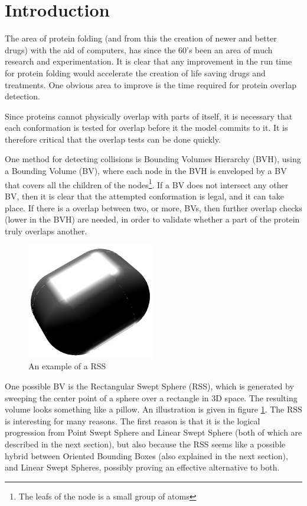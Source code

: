 
\section{Introduction}
\label{introduction}

The area of protein folding (and from this the creation of newer and better drugs) with the aid of computers, has since the 60's been an area of much research and experimentation. It is clear that any improvement in the run time for protein folding would accelerate the creation of life saving drugs and treatments. One obvious area to improve is the time required for protein overlap detection.

Since proteins cannot physically overlap with parts of itself, it is necessary that each conformation is tested for overlap before it the model commits to it. It is therefore critical that the overlap tests can be done quickly.

One method for detecting collisions is Bounding Volumes Hierarchy (BVH), using a Bounding Volume (BV), where each node in the BVH is enveloped by a BV that covers all the children of the nodes\footnote{The leafs of the node is a small group of atoms}. If a BV does not intersect any other BV, then it is clear that the attempted conformation is legal, and it can take place. If there is a overlap between two, or more, BVs, then further overlap checks (lower in the BVH) are needed, in order to validate whether a part of the protein truly overlaps another.

\begin{figure}
\centering
\includegraphics[width=0.5\textwidth]{figures/rss}
\caption{\label{rss-example-figure}An example of a RSS}
\end{figure}

One possible BV is the Rectangular Swept Sphere (RSS), which is generated by sweeping the center point of a sphere over a rectangle in 3D space. The resulting volume looks something like a pillow. An illustration is given in figure \ref{rss-example-figure}. The RSS is interesting for many reasons. The first reason is that it is the logical progression from Point Swept Sphere and Linear Swept Sphere (both of which are described in the next section), but also because the RSS seems like a possible hybrid between Oriented Bounding Boxes (also explained in the next section), and Linear Swept Spheres, possibly proving an effective alternative to both. 


